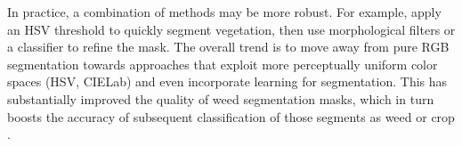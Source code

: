 \documentclass[letterpaper, notitlepage]{report}
\begin{document}
%
In practice, a combination of methods may be more robust. For example, apply an HSV threshold to quickly segment vegetation, then use morphological filters or a classifier to refine the mask. The overall trend  is to move away from pure RGB segmentation towards approaches that exploit more perceptually uniform color spaces (HSV, CIELab) and even incorporate learning for segmentation. This has substantially improved the quality of weed segmentation masks, which in turn boosts the accuracy of subsequent classification of those segments as weed or crop  \parencite{Wu2021-gt}.
%
\end{document}
